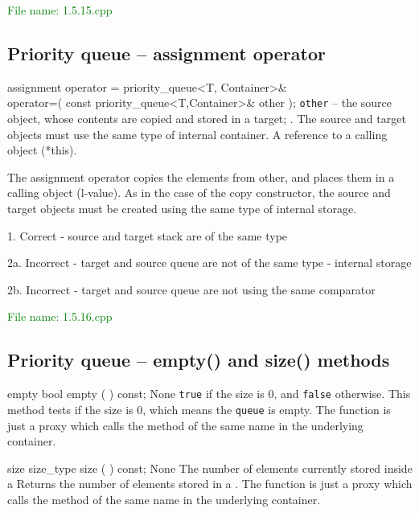 \textcolor{green}{File name: 1.5.15.cpp}


\subsection{Priority queue – assignment operator} %
\begin{methodinfo}
  {assignment operator =}
  {priority_queue<T, Container>&\\
  operator=( const priority_queue<T,Container>& other );}
  {\texttt{other} – the source  object, whose contents are copied and 
  stored in a target; . The source and target objects must use the same 
  type of internal container.}
  {A reference to a calling object (*this).}
  {The assignment operator copies the elements from other, and places them in a calling object (l-value). 
  As in the case of the copy constructor, the source and target objects must be created using the same 
  type of internal storage.

  1. Correct - source and target stack are of the same type
  
  2a. Incorrect - target and source queue are not of the same type - internal storage
  
  2b. Incorrect - target and source queue are not using the same comparator}
\end{methodinfo}

\textcolor{green}{File name: 1.5.16.cpp}


\subsection{Priority queue – empty() and size() methods} %
\begin{methodinfo}
  {empty}
  {bool empty ( ) const;}
  {None}
  {\texttt{true} if the  size is 0, and \texttt{false} otherwise.}
  {This method tests if the  size is 0, which means the \texttt{queue} is empty. 
  The function is just a proxy which calls the method of the same name in the underlying container.}
\end{methodinfo}
\begin{methodinfo}
  {size}
  {size_type size ( ) const;}
  {None}
  {The number of elements currently stored inside a }
  {Returns the number of elements stored in a . The function is just 
  a proxy which calls the method of the same name in the underlying container.}
\end{methodinfo}

